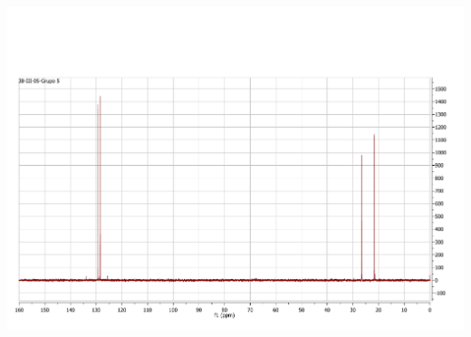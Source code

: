 \documentclass[fleqn,11pt]{SelfArx}
\begin{document}
{
	\begin{minipage}{\textheight}
		\centering
		\includegraphics[height=0.7\textheight]{RMN/DEPTRMN.pdf}
		\label{DEPT}
	\end{minipage}
}
\end{document}
